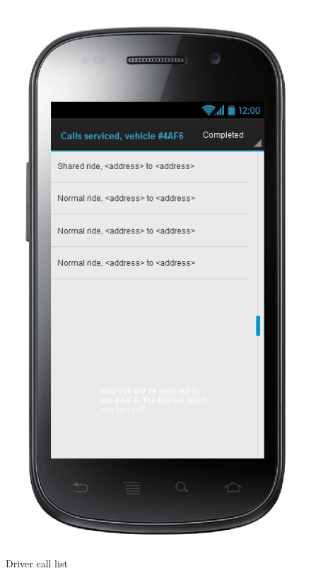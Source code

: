 \begin{center}
\begin{figure} [h]
  	  \includegraphics[scale=0.5]{ui/Driver call list.png}
\caption{Driver call list}
   
	\end{figure}
\end{center}

